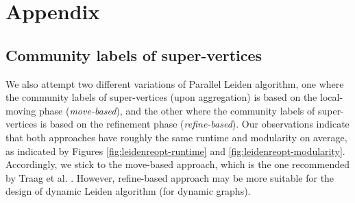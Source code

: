 \section{Appendix}

\subsection{Community labels of super-vertices}

We also attempt two different variations of Parallel Leiden algorithm, one where the community labels of super-vertices (upon aggregation) is based on the local-moving phase (\textit{move-based}), and the other where the community labels of super-vertices is based on the refinement phase (\textit{refine-based}). Our observations indicate that both approaches have roughly the same runtime and modularity on average, as indicated by Figures \ref{fig:leidenreopt-runtime} and \ref{fig:leidenreopt-modularity}. Accordingly, we stick to the move-based approach, which is the one recommended by Traag et al. \cite{com-traag19}. However, refine-based approach may be more suitable for the design of dynamic Leiden algorithm (for dynamic graphs).



